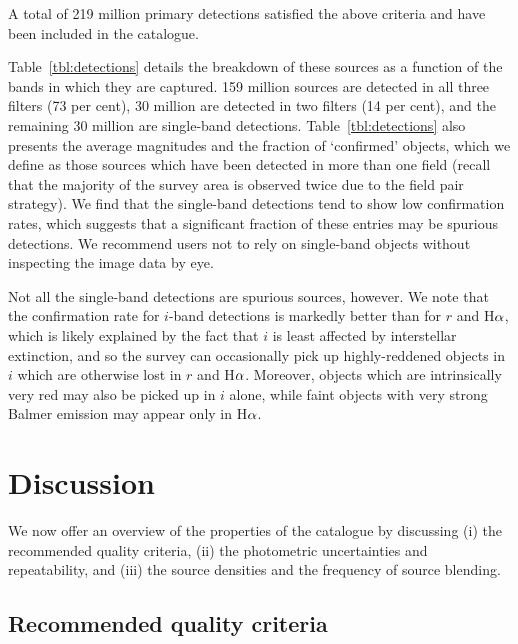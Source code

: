 \documentclass[a4paper,useAMS,usenatbib]{mn2e}
\def\ha{\mbox{H$\rm \alpha$}}
\begin{document}
A total of 219 million primary detections satisfied
the above criteria and have been included in the catalogue.

Table~\ref{tbl:detections} details the breakdown of these
sources as a function of the bands in which they are captured.
159 million sources are detected in all three filters (73 per cent),
30 million are detected in two filters (14 per cent),
and the remaining 30 million are single-band detections.
Table~\ref{tbl:detections} also presents the average magnitudes
and the fraction of `confirmed' objects,
which we define as those sources which have been detected in more than
one field
(recall that the majority of the survey area
is observed twice due to the field pair strategy).
We find that the single-band detections tend to show low confirmation rates,
which suggests that a significant fraction of these entries may be spurious detections.
We recommend users not to rely on single-band objects
without inspecting the image data by eye.

Not all the single-band detections are spurious sources, however.
We note that the confirmation rate for $i$-band detections
is markedly better than for $r$ and \ha,
which is likely explained by the fact that $i$ is least
affected by interstellar extinction, and so the survey can occasionally pick up
highly-reddened objects in $i$ which are otherwise lost in $r$ and \ha.
Moreover, objects which are intrinsically very red may also be picked
up in $i$ alone, while faint objects with very strong Balmer emission
may appear only in \ha.

\section{Discussion}
\label{sec:discussion}

We now offer an overview of the properties of the
catalogue by discussing  
(i) the recommended quality criteria,
(ii) the photometric uncertainties and repeatability,
and (iii) the source densities and the frequency of source blending.

\subsection{Recommended quality criteria}
\label{sec:qualitycriteria}
\end{document}
